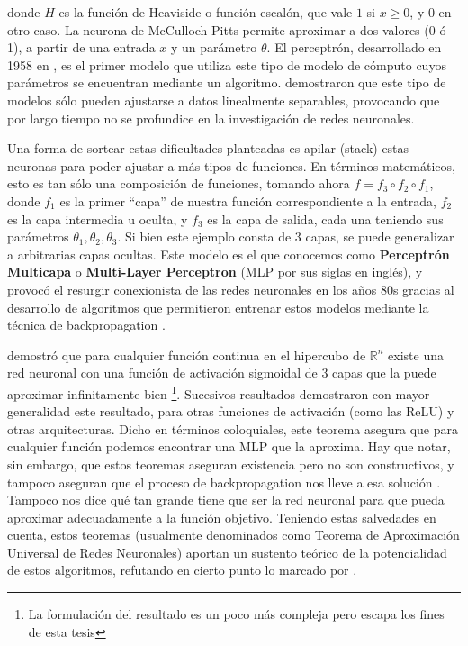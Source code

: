 \noindent donde $H$ es la función de Heaviside o función escalón, que vale $1$ si $x \geq 0$, y $0$ en otro caso. La neurona de McCulloch-Pitts permite aproximar a dos valores (0 ó 1), a partir de una entrada $x$ y un parámetro $\theta$. El perceptrón, desarrollado en 1958 en \citet{rosenblatt1958perceptron}, es el primer modelo que utiliza este tipo de modelo de cómputo cuyos parámetros se encuentran mediante un algoritmo. \citet{minsky1969perceptrons} demostraron que este tipo de modelos sólo pueden ajustarse a datos linealmente separables, provocando que por largo tiempo no se profundice en la investigación de redes neuronales.

Una forma de sortear estas dificultades planteadas es apilar (stack) estas neuronas para poder ajustar a más tipos de funciones. En términos matemáticos, esto es tan sólo una composición de funciones, tomando ahora $f = f_3 \circ f_2 \circ f_1$, donde $f_1$ es la primer ``capa'' de nuestra función correspondiente a la entrada, $f_2$ es la capa intermedia u oculta, y $f_3$ es la capa de salida, cada una teniendo sus parámetros $\theta_1, \theta_2, \theta_3$. Si bien este ejemplo consta de 3 capas, se puede generalizar a arbitrarias capas ocultas. Este modelo es el que conocemos como \textbf{Perceptrón Multicapa} o \textbf{Multi-Layer Perceptron} (MLP por sus siglas en inglés), y provocó el resurgir conexionista de las redes neuronales en los años 80s gracias al desarrollo de algoritmos que permitieron entrenar estos modelos mediante la técnica de backpropagation \cite{rumelhart1986learning}.

\citet{cybenko1989approximation} demostró que para cualquier función continua en el hipercubo de $\mathbb{R}^n$ existe una red neuronal con una función de activación sigmoidal de 3 capas que la puede aproximar infinitamente bien \footnote{La formulación del resultado es un poco más compleja pero escapa los fines de esta tesis}. Sucesivos resultados demostraron con mayor generalidad este resultado, para otras funciones de activación (como las ReLU) y otras arquitecturas. Dicho en términos coloquiales, este teorema asegura que para cualquier función podemos encontrar una MLP que la aproxima. Hay que notar, sin embargo, que estos teoremas aseguran existencia pero no son constructivos, y tampoco aseguran que el proceso de backpropagation nos lleve a esa solución \cite{goodfellow2016deep}. Tampoco nos dice qué tan grande tiene que ser la red neuronal para que pueda aproximar adecuadamente a la función objetivo. Teniendo estas salvedades en cuenta, estos teoremas (usualmente denominados como Teorema de Aproximación Universal de Redes Neuronales) aportan un sustento teórico de la potencialidad de estos algoritmos, refutando en cierto punto lo marcado por \citet{minsky1969perceptrons}.


